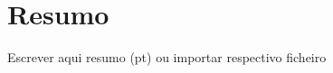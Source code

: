\documentclass[
  oneside,
  11pt, a4paper,
  footinclude=true,
  headinclude=true,
  cleardoublepage=empty
]{scrbook}
\begin{document}
	\cleardoublepage
	\chapter*{Resumo}
	Escrever aqui resumo (pt) ou importar respectivo ficheiro
	
	
	\tableofcontents
	
	
	





	

	
\end{document}
